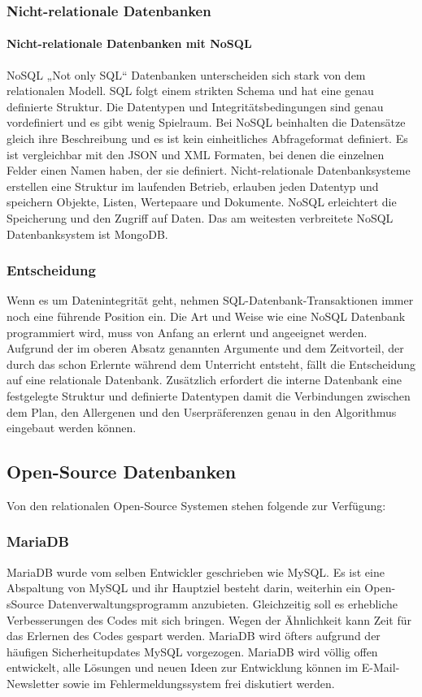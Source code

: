 \subsubsection{Nicht-relationale Datenbanken}
\paragraph{Nicht-relationale Datenbanken mit NoSQL }
NoSQL \cite{NoSQL} „Not only SQL“ Datenbanken unterscheiden sich stark von dem relationalen Modell. SQL folgt einem strikten Schema und hat eine genau definierte Struktur. Die Datentypen und Integritätsbedingungen sind genau vordefiniert und es gibt wenig Spielraum. Bei NoSQL beinhalten die Datensätze gleich ihre Beschreibung und es ist kein einheitliches Abfrageformat definiert. Es ist vergleichbar mit den JSON und XML Formaten, bei denen die einzelnen Felder einen Namen haben, der sie definiert. Nicht-relationale Datenbanksysteme erstellen eine Struktur im laufenden Betrieb, erlauben jeden Datentyp und speichern Objekte, Listen, Wertepaare und Dokumente. NoSQL erleichtert die Speicherung und den Zugriff auf Daten. Das am weitesten verbreitete  NoSQL Datenbanksystem ist MongoDB. 
\subsubsection{Entscheidung}
Wenn es um Datenintegrität geht, nehmen SQL-Datenbank-Transaktionen immer noch eine führende Position ein. Die Art und Weise wie eine NoSQL Datenbank programmiert wird, muss von Anfang an erlernt und angeeignet werden. Aufgrund der im oberen Absatz genannten Argumente und dem Zeitvorteil, der durch das schon Erlernte während dem Unterricht entsteht, fällt die Entscheidung auf eine relationale Datenbank. Zusätzlich erfordert die interne Datenbank eine festgelegte Struktur und definierte Datentypen damit die Verbindungen zwischen dem Plan, den Allergenen und den Userpräferenzen genau in den Algorithmus eingebaut werden können.

\subsection{Open-Source Datenbanken}
Von den relationalen Open-Source Systemen stehen folgende zur Verfügung: 

\subsubsection{MariaDB} 
MariaDB\cite{MariaDBDefinition} wurde vom selben Entwickler geschrieben wie MySQL. Es ist eine Abspaltung von MySQL und ihr Hauptziel besteht darin, weiterhin ein Open-sSource Datenverwaltungsprogramm anzubieten. Gleichzeitig soll es erhebliche Verbesserungen des Codes mit sich bringen. Wegen der Ähnlichkeit kann Zeit für das Erlernen des Codes gespart werden. MariaDB wird öfters aufgrund der häufigen Sicherheitupdates MySQL vorgezogen. MariaDB wird völlig offen entwickelt, alle Lösungen und neuen Ideen zur Entwicklung können im E-Mail-Newsletter sowie im Fehlermeldungssystem frei diskutiert werden. 

